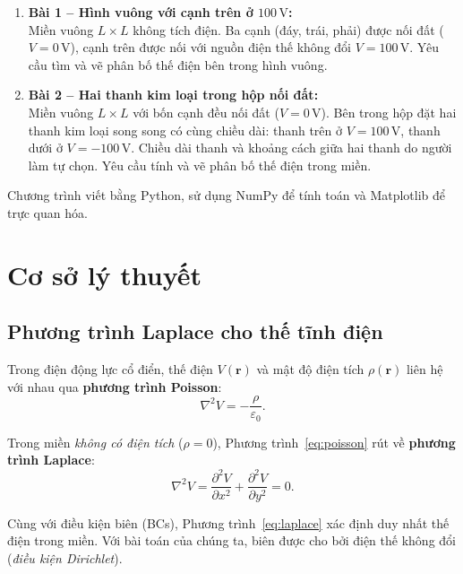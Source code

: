 \documentclass[12pt,a4paper]{article}
\begin{document}
\begin{enumerate}
    \item \textbf{Bài 1 -- Hình vuông với cạnh trên ở $100\,\mathrm{V}$:}\\
    Miền vuông $L\times L$ không tích điện. Ba cạnh (đáy, trái, phải) được nối đất ($V = 0\,\mathrm{V}$), cạnh trên được nối với nguồn điện thế không đổi $V = 100\,\mathrm{V}$. Yêu cầu tìm và vẽ phân bố thế điện bên trong hình vuông.

    \item \textbf{Bài 2 -- Hai thanh kim loại trong hộp nối đất:}\\
    Miền vuông $L\times L$ với bốn cạnh đều nối đất ($V = 0\,\mathrm{V}$). Bên trong hộp đặt hai thanh kim loại song song có cùng chiều dài: thanh trên ở $V = 100\,\mathrm{V}$, thanh dưới ở $V = -100\,\mathrm{V}$. Chiều dài thanh và khoảng cách giữa hai thanh do người làm tự chọn. Yêu cầu tính và vẽ phân bố thế điện trong miền.
\end{enumerate}

Chương trình viết bằng Python, sử dụng NumPy để tính toán và Matplotlib để trực quan hóa.

\section{Cơ sở lý thuyết}

\subsection{Phương trình Laplace cho thế tĩnh điện}

Trong điện động lực cổ điển, thế điện $V(\mathbf{r})$ và mật độ điện tích $\rho(\mathbf{r})$ liên hệ với nhau qua \textbf{phương trình Poisson}:
\begin{equation}
    \nabla^2 V = -\frac{\rho}{\varepsilon_0}.
    \label{eq:poisson}
\end{equation}

Trong miền \emph{không có điện tích} ($\rho = 0$), Phương trình~\eqref{eq:poisson} rút về \textbf{phương trình Laplace}:
\begin{equation}
    \nabla^2 V = \frac{\partial^2 V}{\partial x^2} + \frac{\partial^2 V}{\partial y^2} = 0.
    \label{eq:laplace}
\end{equation}

Cùng với điều kiện biên (BCs), Phương trình~\eqref{eq:laplace} xác định duy nhất thế điện trong miền. Với bài toán của chúng ta, biên được cho bởi điện thế không đổi (\emph{điều kiện Dirichlet}).
\end{document}

